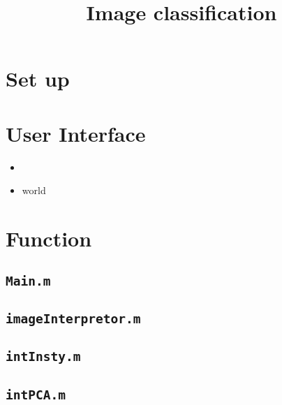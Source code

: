 \documentclass[10pt]{article}
\title{Image classification}
\author{}
\date{}
\begin{document}
 

\maketitle

\section{Set up} 

\section{User Interface} 
\begin{itemize}
\item 
\item world 
\end{itemize}

\section{Function} 

\subsection{\tt Main.m} 

\subsection{\tt imageInterpretor.m} 

\subsection{\tt intInsty.m} 

\subsection{\tt intPCA.m}
\end{document}
